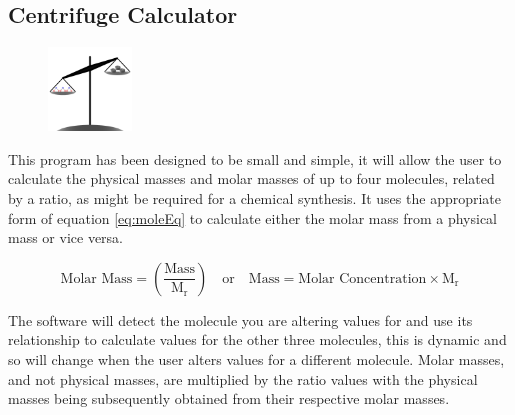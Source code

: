 \documentclass[a4paper]{article}
\begin{document}
	\pagestyle{fancy}
	\renewcommand{\headrulewidth}{0pt}
	\renewcommand{\footrulewidth}{0.4pt}
	\renewcommand{\subsectionmark}[1]{}
	\renewcommand{\sectionmark}[1]{\markboth{#1}{}}
	\rfoot{\thepage}
	\doublespacing

	\begin{centering}
 		\section*{Centrifuge Calculator}
 		\label{sec:centrifuge_calculator}
	\end{centering} 	

		\begin{figure}[ht!]
			\centering
			\includegraphics[height=6em]{Graphics/MoleRatioIcon}
		\end{figure}

		\noindent This program has been designed to be small and simple, it will allow the user to calculate the physical masses and molar masses of up to four molecules, related by a ratio, as might be required for a chemical synthesis. It uses the appropriate form of equation \ref{eq:moleEq} to calculate either the molar mass from a physical mass or vice versa. 

		\begin{equation}
			\text{Molar Mass} = \left( \frac{\text{Mass}}{\text{M}_{\text{r}}} \right) \quad \text{or} \quad \text{Mass} = \text{Molar Concentration} \times \text{M}_{\text{r}}
			\label{eq:moleEq}
		\end{equation}

		\noindent The software will detect the molecule you are altering values for and use its relationship to calculate values for the other three molecules, this is dynamic and so will change when the user alters values for a different molecule. Molar masses, and not physical masses, are multiplied by the ratio values with the physical masses being subsequently obtained from their respective molar masses.
\end{document}
